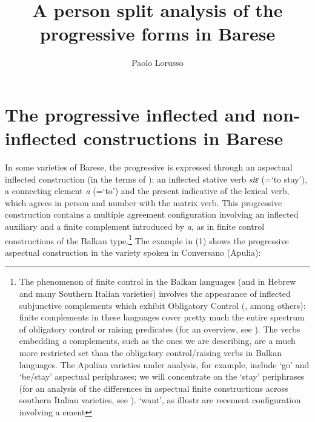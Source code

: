 \documentclass[output=paper]{langsci/langscibook}
\author{Paolo Lorusso\affiliation{Università di Firenze\slash CRIL Università del Salento}}
\title{A person split analysis of the progressive forms in Barese}
\begin{document}

 

 

 

\section{The progressive inflected and non-inflected constructions in Barese}%

In some varieties of Barese, the progressive is expressed through an aspectual inflected construction (in the terms of \citealt{Manzini2005}): an inflected stative verb \textit{stɛ} (=‘to stay’), a connecting element \textit{a} (=‘to’) and the present indicative of the lexical verb, which agrees in person and number with the matrix verb. This progressive construction contains a multiple agreement configuration involving an inflected auxiliary and a finite complement introduced by \textit{a}, as in finite control constructions of the Balkan type.\footnote{The phenomenon of finite control in the Balkan languages (and in Hebrew and many Southern Italian varieties) involves the appearance of inflected subjunctive complements which exhibit Obligatory Control (\citealt{Landau2004}, among others): finite complements in these languages cover pretty much the entire spectrum of obligatory control or raising predicates (for an overview, see \citealt{Ledgeway2015,Manzini2017}). The verbs embedding \textit{a} complements, such as the ones we are describing, are a much more restricted set than the obligatory control/raising verbs in Balkan languages. The Apulian varieties under analysis, for example, include ‘go’ and ‘be/stay’ aspectual periphrases; we will concentrate on the ‘stay’ periphrases (for an analysis of the differences in aspectual finite constructions across southern Italian varieties, see \citet{Manzini2017}). ‘want’, as illustr are reeement configuration involving a ement}  The example in (1) shows the progressive aspectual construction in the variety spoken in Conversano (Apulia): 
\end{document}
